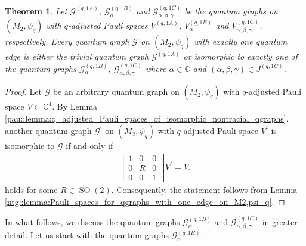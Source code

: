 \documentclass{amsart}
\newtheorem{thm}{Theorem}[section]
\newcommand{\C}{\mathbb{C}}
\DeclareMathOperator{\SO}{SO}
\DeclareMathOperator{\spann}{span}
\begin{document}
\begin{thm}
    \label{ntg::thm:classification_nontracial_qgraphs_with_one_edge}
    Let $\mathcal{G}^{(q, 1A)}$, $\mathcal{G}_{\alpha}^{(q, 1B)}$ and $\mathcal{G}_{\alpha, \beta, \gamma}^{(q, 1C)}$ be the quantum graphs on $(M_2, \psi_q)$ with $q$-adjusted Pauli spaces $V^{(q, 1A)}$, $V_{\alpha}^{(q, 1B)}$ and $V_{\alpha, \beta, \gamma}^{(q, 1C)}$, respectively.
    Every quantum graph $\mathcal{G}$ on $(M_2, \psi_q)$ with exactly one quantum edge is either the trivial quantum graph $\mathcal{G}^{(q,1A)}$ or isomorphic to exactly one of the quantum graphs $\mathcal{G}^{(q,1B)}_\alpha$, $\mathcal{G}_{\alpha, \beta, \gamma}^{(q,1C)}$ where $\alpha \in \C$ and $(\alpha, \beta, \gamma) \in J^{(q,1C)}$.
\end{thm}


\begin{proof}
    Let $\mathcal{G}$ be an arbitrary quantum graph on $(M_2, \psi_q)$ with $q$-adjusted Pauli space $V \subset \C^4$. By Lemma \ref{pau::lemma:q_adjusted_Pauli_spaces_of_isomorphic_nontracial_qgraphs}, another quantum graph $\mathcal{G}^\prime$ on $(M_2, \psi_q)$ with $q$-adjusted Pauli space $V^\prime$ is isomorphic to $\mathcal{G}$ if and only if
    \begin{align*}
        \left[\begin{array}{c|c|c}
            1& 0 & 0 \\
            \hline
            0 & R & 0 \\
            \hline 
            0 & 0 & 1
            \end{array}\right]
            V^\prime = V.
    \end{align*}
    holds for some $R \in \SO(2)$. Consequently, the statement follows from Lemma \ref{ntg::lemma:Pauli_spaces_for_qgraphs_with_one_edge_on_M2,psi_q}.
\end{proof}


In what follows, we discuss the quantum graphs $\mathcal{G}_\alpha^{(q,1B)}$ and $\mathcal{G}_{\alpha, \beta, \gamma}^{(q, 1C)}$ in greater detail. Let us start with the quantum graphs $\mathcal{G}_{\alpha}^{(q,1B)}$.
\end{document}
